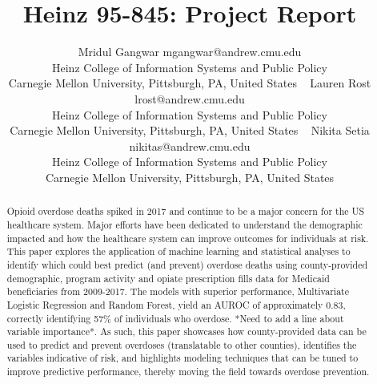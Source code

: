 \documentclass[twoside,10.5pt]{article}
\begin{document}
\title{Heinz 95-845: Project Report}

\author{\name Mridul Gangwar \email mgangwar@andrew.cmu.edu \\
       \addr Heinz College of Information Systems and Public Policy\\
       Carnegie Mellon University, Pittsburgh, PA, United States \
       \AND
       \name Lauren Rost \email lrost@andrew.cmu.edu \\
       \addr Heinz College of Information Systems and Public Policy\\
       Carnegie Mellon University, Pittsburgh, PA, United States \
       \AND
       \name Nikita Setia \email nikitas@andrew.cmu.edu \\
       \addr Heinz College of Information Systems and Public Policy\\
       Carnegie Mellon University, Pittsburgh, PA, United States}
       
\maketitle
\vspace*{5px}
\begin{abstract}
Opioid overdose deaths spiked in 2017 and continue to be a major concern for the US healthcare system. Major efforts have been dedicated to understand the demographic impacted and how the healthcare system can improve outcomes for individuals at risk. This paper explores the application of machine learning and statistical analyses to identify which could best predict (and prevent) overdose deaths using county-provided demographic, program activity and opiate prescription fills data for Medicaid beneficiaries from 2009-2017. The models with superior performance, Multivariate Logistic Regression and Random Forest, yield an AUROC of approximately 0.83, correctly identifying 57\% of individuals who overdose. *Need to add a line about variable importance*. As such, this paper showcases how county-provided data can be used to predict and prevent overdoses (translatable to other counties), identifies the variables indicative of risk, and highlights modeling techniques that can be tuned to improve predictive performance, thereby moving the field towards overdose prevention.  
\end{abstract}
\end{document}
